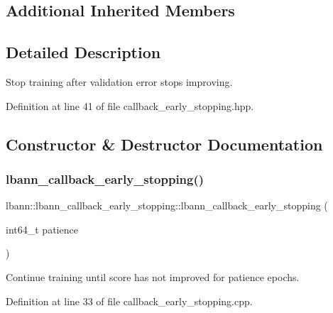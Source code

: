 \subsection*{Additional Inherited Members}


\subsection{Detailed Description}
Stop training after validation error stops improving. 

Definition at line 41 of file callback\+\_\+early\+\_\+stopping.\+hpp.



\subsection{Constructor \& Destructor Documentation}
\mbox{\label{classlbann_1_1lbann__callback__early__stopping_ac0140e05eccd5280d53a8e8d480c0ce3}} 
\subsubsection{\texorpdfstring{lbann\+\_\+callback\+\_\+early\+\_\+stopping()}{lbann\_callback\_early\_stopping()}\hspace{0.1cm}{\footnotesize\ttfamily [1/2]}}
{\footnotesize\ttfamily lbann\+::lbann\+\_\+callback\+\_\+early\+\_\+stopping\+::lbann\+\_\+callback\+\_\+early\+\_\+stopping (\begin{DoxyParamCaption}\item[{int64\+\_\+t}]{patience }\end{DoxyParamCaption})}

Continue training until score has not improved for patience epochs. 

Definition at line 33 of file callback\+\_\+early\+\_\+stopping.\+cpp.


